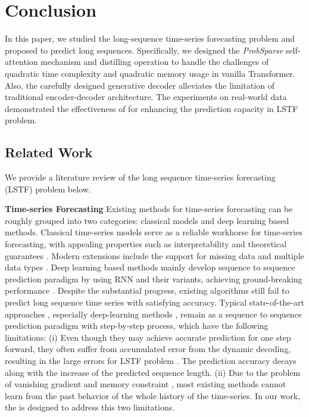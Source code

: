 \section{Conclusion}
In this paper, we studied the long-sequence time-series forecasting problem and  proposed {\mn} to predict long sequences. Specifically, we designed the \emph{ProbSparse} self-attention mechanism and distilling operation to handle the challenges of quadratic time complexity and quadratic memory usage in vanilla Transformer. Also, the carefully designed generative decoder alleviates the limitation of traditional encoder-decoder architecture. The experiments on real-world data demonstrated the effectiveness of {\mn} for enhancing the prediction capacity in LSTF problem.

\begin{appendices}

\section{Related Work}
\label{sec:appendix.relatedwork}
We provide a literature review of the long sequence time-series forecasting (LSTF) problem below.

\textbf{Time-series Forecasting} Existing methods for time-series forecasting can be roughly grouped into two categories: classical models and deep learning based methods.
Classical time-series models serve as a reliable workhorse for time-series forecasting, with appealing properties such as interpretability and theoretical guarantees \cite{box2015time,ray1990time}.
Modern extensions include the support for missing data \cite{seeger2017approximate} and multiple data types \cite{seeger2016bayesian}.
Deep learning based methods mainly develop sequence to sequence prediction paradigm by using RNN and their variants, achieving ground-breaking performance \cite{hochreiter1997long,li2017graph,yu2017long}.
Despite the substantial progress, existing algorithms still fail to predict long sequence time series with satisfying accuracy. Typical state-of-the-art approaches \cite{seeger2017approximate,seeger2016bayesian}, especially deep-learning methods \cite{yu2017long,conf/ijcai/QinSCCJC17,flunkert2017deepar,mukherjee2018armdn,wen2017multi}, remain as a sequence to sequence prediction paradigm with step-by-step process, which have the following limitations: (i) Even though they may achieve accurate prediction for one step forward, they often suffer from accumulated error from the dynamic decoding, resulting in the large errors for LSTF problem \cite{journals/corr/abs-1904-07464,conf/ijcai/QinSCCJC17}. The prediction accuracy decays along with the increase of the predicted sequence length. (ii) Due to the problem of vanishing gradient and memory constraint \cite{sutskever2014sequence}, most existing methods cannot learn from the past behavior of the whole history of the time-series. In our work, the {\mn} is designed to address this two limitations.


\end{appendices}
